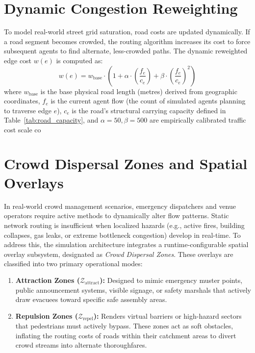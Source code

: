 \documentclass[12pt,a4paper,oneside]{report}
\begin{document}
\section{Dynamic Congestion Reweighting}
To model real-world street grid saturation, road costs are updated dynamically. If a road segment becomes crowded, the routing algorithm increases its cost to force subsequent agents to find alternate, less-crowded paths. The dynamic reweighted edge cost $w(e)$ is computed as:
\begin{equation}
w(e) = w_{\text{base}} \cdot \left(1 + \alpha \cdot \left(\frac{f_e}{c_e}\right) + \beta \cdot \left(\frac{f_e}{c_e}\right)^2\right)
\label{eq:congestion_reweighting}
\end{equation}
where $w_{\text{base}}$ is the base physical road length (metres) derived from geographic coordinates, $f_e$ is the current agent flow (the count of simulated agents planning to traverse edge $e$), $c_e$ is the road's structural carrying capacity defined in Table~\ref{tab:road_capacity}, and $\alpha=50, \beta=500$ are empirically calibrated traffic cost scale co\section{Crowd Dispersal Zones and Spatial Overlays}
In real-world crowd management scenarios, emergency dispatchers and venue operators require active methods to dynamically alter flow patterns. Static network routing is insufficient when localized hazards (e.g., active fires, building collapses, gas leaks, or extreme bottleneck congestion) develop in real-time. To address this, the simulation architecture integrates a runtime-configurable spatial overlay subsystem, designated as \textit{Crowd Dispersal Zones}. These overlays are classified into two primary operational modes:
\begin{enumerate}
    \item \textbf{Attraction Zones ($\mathcal{Z}_{\text{attract}}$):} Designed to mimic emergency muster points, public announcement systems, visible signage, or safety marshals that actively draw evacuees toward specific safe assembly areas.
    \item \textbf{Repulsion Zones ($\mathcal{Z}_{\text{repel}}$):} Renders virtual barriers or high-hazard sectors that pedestrians must actively bypass. These zones act as soft obstacles, inflating the routing costs of roads within their catchment areas to divert crowd streams into alternate thoroughfares.
\end{enumerate}
\end{document}
